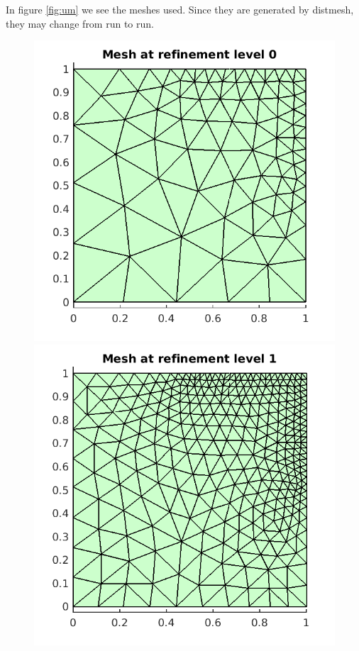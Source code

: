 \documentclass{article}
\begin{document}
In figure \ref{fig:um} we see the meshes used.
Since they are generated by distmesh, they may change from run to run.

\begin{figure}[!ht]
\centering
\includegraphics[scale=0.5]{um_1.png}
\includegraphics[scale=0.5]{um_2.png}

\end{figure}
\end{document}
